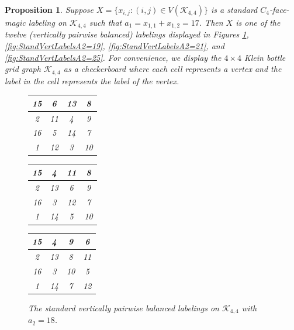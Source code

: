 \documentclass[10pt, reqno]{amsart}
\theoremstyle{definition}
\theoremstyle{plain}
\newtheorem{proposition}[definition]{Proposition}
\begin{document}
\begin{proposition} 
\label{propVerticalPairwiseBalancedCondition_A1=17}
  Suppose $X=\{ x_{i,j} : (i,j) \in V(\mathcal{K}_{4,4})\}$ 
  is a standard $C_4$-face-magic labeling on $\mathcal{K}_{4,4}$ 
  such that $a_1=x_{1,1}+x_{1,2}=17$.
  Then $X$ is one of the twelve (vertically pairwise balanced) labelings displayed 
  in Figures \ref{fig:StandVertLabelsA2=18}, \ref{fig:StandVertLabelsA2=19},
  \ref{fig:StandVertLabelsA2=21}, and \ref{fig:StandVertLabelsA2=25}.
  For convenience, we display the 
  $4 \times 4$ Klein bottle grid graph $\mathcal{K}_{4,4}$
  as a checkerboard where each cell represents a vertex
  and the label in the cell represents the label of the vertex.

  \begin{figure}[hbt!]
    \centering
    \begin{tabular}{|c|c|c|c|} \hline
       15  &6  &13  &8  \\  \hline
        2  &11   &4   &9  \\  \hline
       16  &5   &14  &7  \\  \hline
        1  &12  &3   &10  \\  \hline
    \end{tabular}
\hspace{0.15in}\begin{tabular}{|c|c|c|c|} \hline
       15  &4  &11  &8  \\  \hline
        2  &13   &6   &9  \\  \hline
       16  &3   &12  &7  \\  \hline
        1  &14  &5   &10  \\  \hline
    \end{tabular}
 \hspace{0.15in}   \begin{tabular}{|c|c|c|c|} \hline
       15  &4  &9  &6  \\  \hline
        2  &13   &8   &11  \\  \hline
       16  &3   &10  &5  \\  \hline
        1  &14  &7   &12  \\  \hline
    \end{tabular}
    \caption{The standard vertically pairwise balanced labelings on
    $\mathcal{K}_{4,4}$ with $a_2=18$.}
    \label{fig:StandVertLabelsA2=18}
\end{figure}



\end{proposition}
\end{document}
